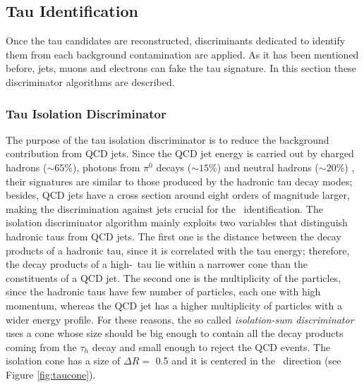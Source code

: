 
\subsection{Tau Identification}
\label{subsec:TauIdentification}

\noindent Once the tau candidates are reconstructed, discriminants dedicated
to identify them from each background contamination are applied. As it has 
been mentioned before, jets, muons and electrons can fake the 
tau signature. In this section these discriminator algorithms
are described. 

\subsubsection{Tau Isolation Discriminator}
\label{subsubsec:IsoDiscriminators}

The purpose of the tau isolation discriminator is to reduce the background contribution
from QCD jets. Since the QCD jet energy is carried out by charged hadrons ($\sim 65 \%$), photons 
from $\pi^{0}$ decays ($\sim 15 \%$) and neutral hadrons ($\sim 20 \%$) \cite{CMS-PAS-PFT-10-001},
their signatures are similar to those produced by the hadronic tau decay modes; besides, QCD 
jets have a cross section around eight orders of magnitude larger, making the discrimination
against jets crucial for the \tauh~identification. The isolation discriminator
algorithm mainly exploits two variables that distinguish hadronic taus from 
QCD jets. The first one is the distance between the decay products of a hadronic tau, since 
it is correlated with the tau energy; therefore, the decay products of 
a high-\pt~tau lie within a narrower cone than the constituents of a QCD jet. The 
second one is the multiplicity of the particles, since the hadronic 
taus have few number of particles, each one with high momentum, whereas 
the QCD jet has a higher multiplicity of particles with 
a wider energy profile. For these reasons, the so 
called \textit{isolation-sum discriminator} uses a cone whose size 
should be big enough to contain all the decay products coming 
from the $\tau_{h}$ decay and small enough to reject the QCD events. The 
isolation cone has a size of $\Delta R =$ 0.5 and it 
is centered in the \tauh~direction (see Figure \ref{fig:taucone}). \\


